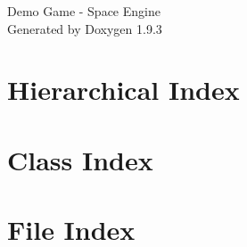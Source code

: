 \documentclass[twoside]{book}
\newcommand{\+}{\discretionary{\mbox{\scriptsize$\hookleftarrow$}}{}{}}
\newcommand{\clearemptydoublepage}{%
    \newpage{\pagestyle{empty}\cleardoublepage}%
  }
\begin{document}
  \raggedbottom
    \hypersetup{pageanchor=false,
                bookmarksnumbered=true,
                pdfencoding=unicode
               }
  \begin{titlepage}
  \vspace*{7cm}
  \begin{center}%
  {\Large Demo Game -\/ Space Engine}\\
  \vspace*{1cm}
  {\large Generated by Doxygen 1.9.3}\\
  \end{center}
  \end{titlepage}
  \clearemptydoublepage
  \tableofcontents
  \clearemptydoublepage
  \hypersetup{pageanchor=true}
\chapter{Hierarchical Index}

\chapter{Class Index}

\chapter{File Index}

\end{document}
